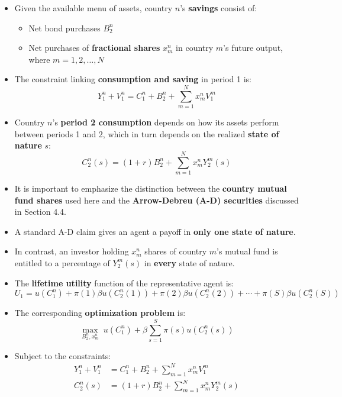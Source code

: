 \documentclass[12pt]{article}
\begin{document}
\begin{itemize}
\begin{itemize}
    \item Given the available menu of assets, country \( n \)'s \textbf{savings} consist of:
    \begin{itemize}
        \item Net bond purchases \( B_2^n \)
        \item Net purchases of \textbf{fractional shares} \( x_m^n \) in country \( m \)'s future output, where \( m = 1, 2, \dots, N \)
    \end{itemize}
    
    \item The constraint linking \textbf{consumption and saving} in period 1 is:
    \[
    Y_1^n + V_1^n = C_1^n + B_2^n + \sum_{m=1}^{N} x_m^n V_1^m
    \]

    \item Country \( n \)'s \textbf{period 2 consumption} depends on how its assets perform between periods 1 and 2, which in turn depends on the realized \textbf{state of nature} \( s \):
    \[
    C_2^n(s) = (1 + r)B_2^n + \sum_{m=1}^{N} x_m^n Y_2^m(s)
    \]

    \item It is important to emphasize the distinction between the \textbf{country mutual fund shares} used here and the \textbf{Arrow-Debreu (A-D) securities} discussed in Section 4.4.
    
    \item A standard A-D claim gives an agent a payoff in \textbf{only one state of nature}.
    
    \item In contrast, an investor holding \( x_m^n \) shares of country \( m \)'s mutual fund is entitled to a percentage of \( Y_2^m(s) \) in \textbf{every} state of nature.
\end{itemize}

\begin{itemize}
    \item The \textbf{lifetime utility} function of the representative agent is:
    \[
    U_1 = u(C_1^n) + \pi(1)\beta u(C_2^n(1)) + \pi(2)\beta u(C_2^n(2)) + \cdots + \pi(S)\beta u(C_2^n(S))
    \]

    \item The corresponding \textbf{optimization problem} is:
    \[
    \max_{B_2^n, x_m^n} \; u(C_1^n) + \beta \sum_{s=1}^{S} \pi(s) u(C_2^n(s))
    \]

    \item Subject to the constraints:
    \begin{align}
        Y_1^n + V_1^n &= C_1^n + B_2^n + \sum_{m=1}^{N} x_m^n V_1^m \tag{30} \\
        C_2^n(s) &= (1 + r)B_2^n + \sum_{m=1}^{N} x_m^n Y_2^m(s) \tag{31}
    \end{align}
\end{itemize}


\end{itemize}
\end{document}
